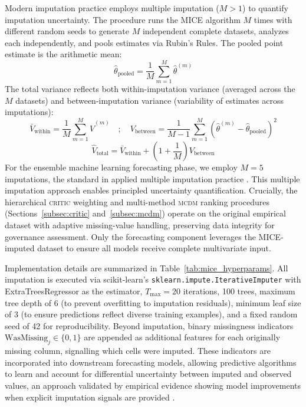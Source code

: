 \documentclass[12pt,a4paper]{article}
\newcommand{\MCDM}{\textsc{mcdm}\xspace}
\newcommand{\CRITIC}{\textsc{critic}\xspace}
\begin{document}
Modern imputation practice employs multiple imputation ($M > 1$) to quantify imputation uncertainty. The procedure runs the MICE algorithm $M$ times with different random seeds to generate $M$ independent complete datasets, analyzes each independently, and pools estimates via Rubin's Rules. The pooled point estimate is the arithmetic mean:
\begin{equation}
\label{eq:rubin_point}
\hat{\theta}_{\text{pooled}} = \frac{1}{M} \sum_{m=1}^{M} \hat{\theta}^{(m)}
\end{equation}
The total variance reflects both within-imputation variance (averaged across the $M$ datasets) and between-imputation variance (variability of estimates across imputations):
\begin{equation}
\label{eq:rubin_within}
\bar{V}_{\text{within}} = \frac{1}{M} \sum_{m=1}^{M} \hat{V}^{(m)} \quad ; \quad V_{\text{between}} = \frac{1}{M-1} \sum_{m=1}^{M} \left(\hat{\theta}^{(m)} - \hat{\theta}_{\text{pooled}}\right)^2
\end{equation}
\begin{equation}
\label{eq:rubin_total}
\hat{V}_{\text{total}} = \bar{V}_{\text{within}} + \left(1 + \frac{1}{M}\right) V_{\text{between}}
\end{equation}
For the ensemble machine learning forecasting phase, we employ $M = 5$ imputations, the standard in applied multiple imputation practice \citep{vanBuuren2018}. This multiple imputation approach enables principled uncertainty quantification. Crucially, the hierarchical \CRITIC weighting and multi-method \MCDM ranking procedures (Sections~\ref{subsec:critic} and~\ref{subsec:mcdm}) operate on the original empirical dataset with adaptive missing-value handling, preserving data integrity for governance assessment. Only the forecasting component leverages the MICE-imputed dataset to ensure all models receive complete multivariate input.

Implementation details are summarized in Table~\ref{tab:mice_hyperparams}. All imputation is executed via scikit-learn's \texttt{sklearn.impute.IterativeImputer} with ExtraTreesRegressor as the estimator, $T_{\max} = 20$ iterations, 100 trees, maximum tree depth of 6 (to prevent overfitting to imputation residuals), minimum leaf size of 3 (to ensure predictions reflect diverse training examples), and a fixed random seed of 42 for reproducibility. Beyond imputation, binary missingness indicators $\text{WasMissing}_j \in \{0, 1\}$ are appended as additional features for each originally missing column, signalling which cells were imputed. These indicators are incorporated into downstream forecasting models, allowing predictive algorithms to learn and account for differential uncertainty between imputed and observed values, an approach validated by empirical evidence showing model improvements when explicit imputation signals are provided \citep{vanBuuren2018}.
\end{document}
